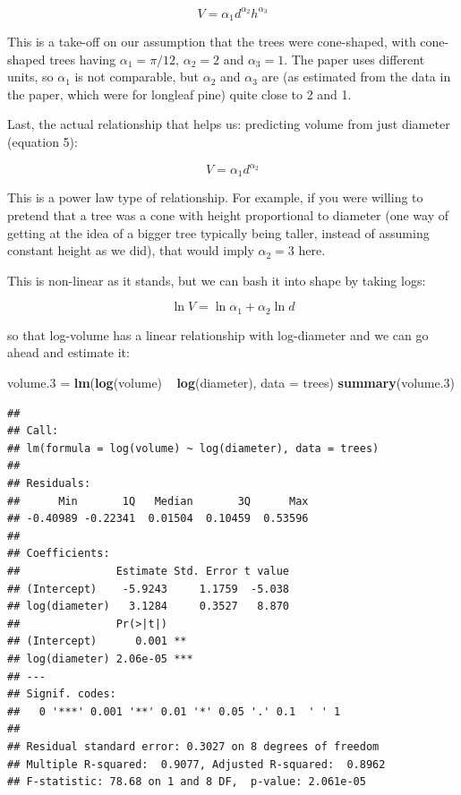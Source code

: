 \documentclass[]{tufte-book}
\newenvironment{Shaded}{}{}
\newcommand{\DataTypeTok}[1]{\textcolor[rgb]{0.56,0.13,0.00}{#1}}
\newcommand{\FloatTok}[1]{\textcolor[rgb]{0.25,0.63,0.44}{#1}}
\newcommand{\KeywordTok}[1]{\textcolor[rgb]{0.00,0.44,0.13}{\textbf{#1}}}
\newcommand{\NormalTok}[1]{#1}
\newcommand{\OperatorTok}[1]{\textcolor[rgb]{0.40,0.40,0.40}{#1}}
\newcommand{\StringTok}[1]{\textcolor[rgb]{0.25,0.44,0.63}{#1}}
\theoremstyle{definition}
\theoremstyle{definition}
\theoremstyle{definition}
\theoremstyle{remark}
\begin{document}
\[  V = \alpha_1 d^{\alpha_2} h^{\alpha_3} \]

This is a take-off on our assumption that the trees were cone-shaped,
with cone-shaped trees having \(\alpha_1=\pi/12\), \(\alpha_2=2\) and
\(\alpha_3=1\). The paper uses different units, so \(\alpha_1\) is not
comparable, but \(\alpha_2\) and \(\alpha_3\) are (as estimated from the
data in the paper, which were for longleaf pine) quite close to 2 and 1.

Last, the actual relationship that helps us: predicting volume from just
diameter (equation 5):

\[  V = \alpha_1 d^{\alpha_2}\]

This is a power law type of relationship. For example, if you were
willing to pretend that a tree was a cone with height proportional to
diameter (one way of getting at the idea of a bigger tree typically
being taller, instead of assuming constant height as we did), that would
imply \(\alpha_2=3\) here.

This is non-linear as it stands, but we can bash it into shape by taking
logs:

\[
\ln V = \ln \alpha_1 + \alpha_2 \ln d
\]

so that log-volume has a linear relationship with log-diameter and we
can go ahead and estimate it:

\begin{Shaded}
\begin{Highlighting}[]
\NormalTok{volume}\FloatTok{.3}\NormalTok{ =}\StringTok{ }\KeywordTok{lm}\NormalTok{(}\KeywordTok{log}\NormalTok{(volume) }\OperatorTok{~}\StringTok{ }\KeywordTok{log}\NormalTok{(diameter), }\DataTypeTok{data =}\NormalTok{ trees)}
\KeywordTok{summary}\NormalTok{(volume}\FloatTok{.3}\NormalTok{)}
\end{Highlighting}
\end{Shaded}

\begin{verbatim}
## 
## Call:
## lm(formula = log(volume) ~ log(diameter), data = trees)
## 
## Residuals:
##      Min       1Q   Median       3Q      Max 
## -0.40989 -0.22341  0.01504  0.10459  0.53596 
## 
## Coefficients:
##               Estimate Std. Error t value
## (Intercept)    -5.9243     1.1759  -5.038
## log(diameter)   3.1284     0.3527   8.870
##               Pr(>|t|)    
## (Intercept)      0.001 ** 
## log(diameter) 2.06e-05 ***
## ---
## Signif. codes:  
##   0 '***' 0.001 '**' 0.01 '*' 0.05 '.' 0.1  ' ' 1
## 
## Residual standard error: 0.3027 on 8 degrees of freedom
## Multiple R-squared:  0.9077, Adjusted R-squared:  0.8962 
## F-statistic: 78.68 on 1 and 8 DF,  p-value: 2.061e-05
\end{verbatim}
\end{document}
